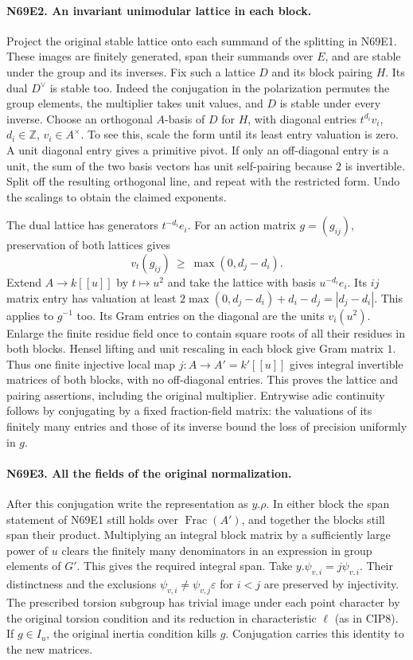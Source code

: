 \paragraph{N69E2. An invariant unimodular lattice in each block.}
Project the original stable lattice onto each summand of the
splitting in N69E1. These images are finitely generated, span
their summands over $E$, and are stable under the group and its
inverses. Fix such a lattice $D$ and its block pairing $H$.
Its dual $D^\vee$ is stable too. Indeed the conjugation in the
polarization permutes the group elements, the multiplier takes
unit values, and $D$ is stable under every inverse. Choose an
orthogonal $A$-basis of $D$ for $H$, with diagonal entries
$t^{d_i}v_i$, $d_i\in\mathbb Z$, $v_i\in A^\times$. To see this,
scale the form until its least entry valuation is zero. A unit
diagonal entry gives a primitive pivot. If only an off-diagonal
entry is a unit, the sum of the two basis vectors has unit
self-pairing because $2$ is invertible. Split off the resulting
orthogonal line, and repeat with the restricted form. Undo the
scalings to obtain the claimed exponents.

The dual lattice has generators $t^{-d_i}e_i$. For an action
matrix $g=(g_{ij})$, preservation of both lattices gives
\[
       v_t(g_{ij})\ \ge\ \max(0,d_j-d_i).
\]
Extend $A\to k[[u]]$ by $t\mapsto u^2$ and take the lattice with
basis $u^{-d_i}e_i$. Its $ij$ matrix entry has valuation at least
$2\max(0,d_j-d_i)+d_i-d_j=|d_j-d_i|$. This applies to $g^{-1}$
too. Its Gram entries on the diagonal are the units $v_i(u^2)$.
Enlarge the finite residue field once to contain square roots of
all their residues in both blocks. Hensel lifting and unit rescaling
in each block give Gram matrix $1$. Thus one finite injective local
map $j:A\to A'=k'[[u]]$ gives integral invertible matrices of both
blocks, with no off-diagonal entries. This proves the lattice and
pairing assertions, including the original multiplier. Entrywise
adic continuity follows by conjugating by a fixed fraction-field
matrix: the valuations of its finitely many entries and those of
its inverse bound the loss of precision uniformly in $g$.

\paragraph{N69E3. All the fields of the original normalization.}
After this conjugation write the representation as $y.\rho$.
In either block the span statement of N69E1 still holds over
$\operatorname{Frac}(A')$, and together the blocks still span
their product. Multiplying an integral block matrix by a sufficiently
large power of $u$ clears the finitely many denominators in an
expression in group elements of $G'$. This gives the required
integral span. Take $y.\psi_{v,i}=j\psi_{v,i}$. Their distinctness
and the exclusions $\psi_{v,i}\ne\psi_{v,j}\varepsilon$ for $i<j$
are preserved by injectivity. The prescribed torsion subgroup
has trivial image under each point character by the original
torsion condition and its reduction in characteristic $\ell$
(as in CIP8). If $g\in I_u$, the original inertia condition kills
$g$. Conjugation carries this identity to the new matrices.

